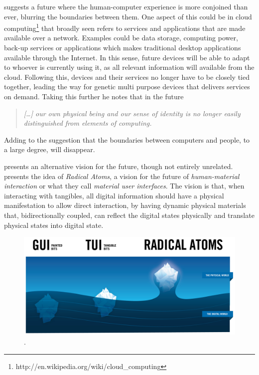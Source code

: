 \citeauthor{abowd2012next} suggests a future where the human-computer experience is more conjoined than ever, blurring the boundaries between them.
One aspect of this could be in cloud computing\footnote{http://en.wikipedia.org/wiki/cloud\_computing} that broadly seen refers to services and applications that are made available over a network.
Examples could be data storage, computing power, back-up services or applications which makes traditional desktop applications available through the Internet.
In this sense, future devices will be able to adapt to whoever is currently using it, as all relevant information will available from the cloud.
Following this, devices and their services no longer have to be closely tied together, leading the way for genetic multi purpose devices that delivers services on demand.
Taking this further he notes that in the future
\begin{quote}
\emph{[\ldots] our own physical being and our sense of identity is no longer easily distinguished from elements of computing.}
\end{quote}
Adding to the suggestion that the boundaries between computers and people, to a large degree, will disappear.

\citet{ishii2012radical} presents an alternative vision for the future, though not entirely unrelated.
\citeauthor{ishii2012radical} presents the idea of \textit{Radical Atoms}, a vision for the future of \textit{human-material interaction} or what they call \textit{material user interfaces}.
The vision is that, when interacting with tangibles, all digital information should have a physical manifestation to allow direct interaction, by having dynamic physical materials that, bidirectionally coupled, can reflect the digital states physically and translate physical states into digital state.

\begin{figure}[h]
  \centering
      \includegraphics[width=\linewidth]{figures/radicalatoms}
  \caption{.}
   \label{radicalatoms}
\end{figure}

